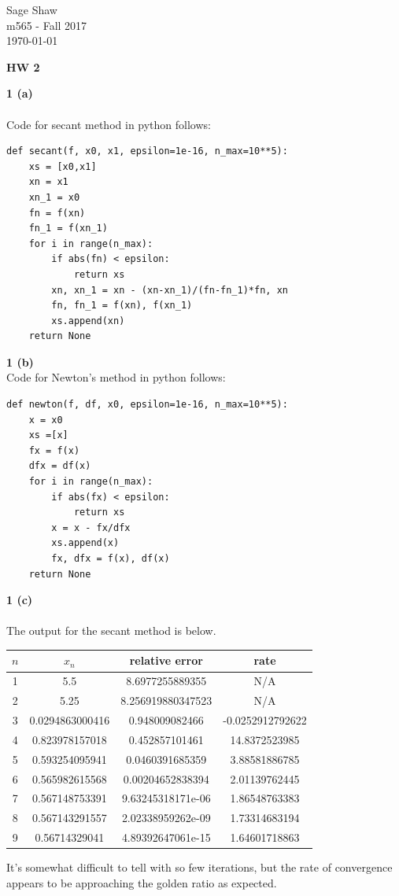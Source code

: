 \documentclass[12pt]{article}
\newcommand{\problem}[1]{\hspace{-4 ex} \large \textbf{#1}\\}
\begin{document}
	\thispagestyle{empty}
	
	\begin{flushright}
		Sage Shaw \\
		m565 - Fall 2017 \\
		\today
	\end{flushright}
	
{\large \textbf{HW 2}}\bigbreak

\problem{1 (a)}\\
	Code for secant method in python follows:
	\singlespacing
	\begin{lstlisting}
def secant(f, x0, x1, epsilon=1e-16, n_max=10**5):
	xs = [x0,x1]
	xn = x1
	xn_1 = x0
	fn = f(xn)
	fn_1 = f(xn_1)
	for i in range(n_max):
		if abs(fn) < epsilon:
			return xs
		xn, xn_1 = xn - (xn-xn_1)/(fn-fn_1)*fn, xn
		fn, fn_1 = f(xn), f(xn_1)
		xs.append(xn)
	return None
	\end{lstlisting}
	\doublespacing
	
\problem{1 (b)}
	Code for Newton's method in python follows:
	\singlespacing
	\begin{lstlisting}
def newton(f, df, x0, epsilon=1e-16, n_max=10**5):
	x = x0
	xs =[x]
	fx = f(x)
	dfx = df(x)
	for i in range(n_max):
		if abs(fx) < epsilon:
			return xs
		x = x - fx/dfx
		xs.append(x)
		fx, dfx = f(x), df(x)
	return None
	\end{lstlisting}
	\doublespacing
\problem{1 (c)}\\
	The output for the secant method is below.
	\begin{center}
		\begin{tabular}{|c|c|c|c|}
			\hline
			$n$&$x_n$&relative error&rate\\ \hline
			1&5.5&8.6977255889355&N/A\\ \hline
			2&5.25&8.256919880347523&N/A\\ \hline
			3&0.0294863000416&0.948009082466&-0.0252912792622\\ \hline
			4&0.823978157018&0.452857101461&14.8372523985\\ \hline
			5&0.593254095941&0.0460391685359&3.88581886785\\ \hline
			6&0.565982615568&0.00204652838394&2.01139762445\\ \hline
			7&0.567148753391&9.63245318171e-06&1.86548763383\\ \hline
			8&0.567143291557&2.02338959262e-09&1.73314683194\\ \hline
			9&0.56714329041&4.89392647061e-15&1.64601718863\\ \hline
		\end{tabular}
	\end{center}
	It's somewhat difficult to tell with so few iterations, but the rate of convergence appears to be approaching the golden ratio as expected.
\end{document}
